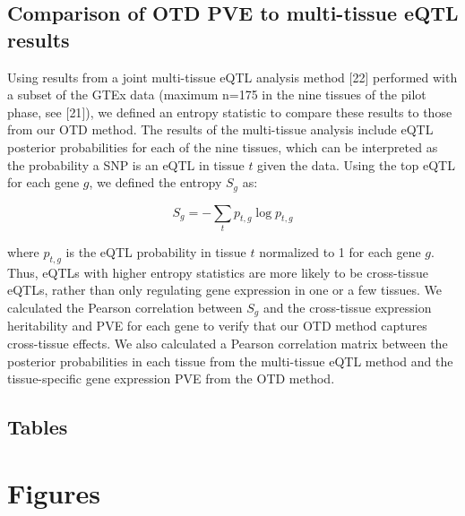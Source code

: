 \documentclass[]{article}
\begin{document}
\subsection{Comparison of OTD PVE to multi-tissue eQTL
results}\label{comparison-of-otd-pve-to-multi-tissue-eqtl-results}

Using results from a joint multi-tissue eQTL analysis method {[}22{]}
performed with a subset of the GTEx data (maximum n=175 in the nine
tissues of the pilot phase, see {[}21{]}), we defined an entropy
statistic to compare these results to those from our OTD method. The
results of the multi-tissue analysis include eQTL posterior
probabilities for each of the nine tissues, which can be interpreted as
the probability a SNP is an eQTL in tissue \(t\) given the data. Using
the top eQTL for each gene \(g\), we defined the entropy \(S_g\) as:

\[ S_g = -\sum_{t}p_{t,g} \log p_{t,g} \]

where \(p_{t,g}\) is the eQTL probability in tissue \(t\) normalized to
1 for each gene \(g\). Thus, eQTLs with higher entropy statistics are
more likely to be cross-tissue eQTLs, rather than only regulating gene
expression in one or a few tissues. We calculated the Pearson
correlation between \(S_g\) and the cross-tissue expression heritability
and PVE for each gene to verify that our OTD method captures
cross-tissue effects. We also calculated a Pearson correlation matrix
between the posterior probabilities in each tissue from the multi-tissue
eQTL method and the tissue-specific gene expression PVE from the OTD
method.

\subsection{Tables}\label{tables}

\section{Figures}\label{figures}
\end{document}
